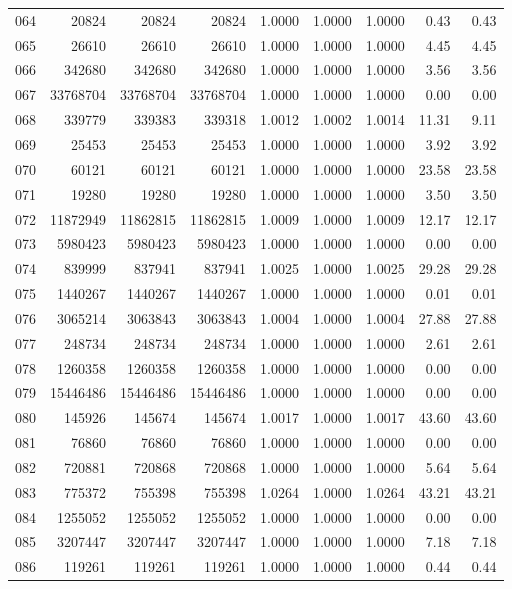 \begin{longtable}{crrrrrrrr}
064 & 20824 & 20824 & 20824 & 1.0000 & 1.0000 & 1.0000 & 0.43 & 0.43 \\
065 & 26610 & 26610 & 26610 & 1.0000 & 1.0000 & 1.0000 & 4.45 & 4.45 \\
066 & 342680 & 342680 & 342680 & 1.0000 & 1.0000 & 1.0000 & 3.56 & 3.56 \\
067 & 33768704 & 33768704 & 33768704 & 1.0000 & 1.0000 & 1.0000 & 0.00 & 0.00 \\
068 & 339779 & 339383 & 339318 & 1.0012 & 1.0002 & 1.0014 & 11.31 & 9.11 \\
069 & 25453 & 25453 & 25453 & 1.0000 & 1.0000 & 1.0000 & 3.92 & 3.92 \\
070 & 60121 & 60121 & 60121 & 1.0000 & 1.0000 & 1.0000 & 23.58 & 23.58 \\
071 & 19280 & 19280 & 19280 & 1.0000 & 1.0000 & 1.0000 & 3.50 & 3.50 \\
072 & 11872949 & 11862815 & 11862815 & 1.0009 & 1.0000 & 1.0009 & 12.17 & 12.17 \\
073 & 5980423 & 5980423 & 5980423 & 1.0000 & 1.0000 & 1.0000 & 0.00 & 0.00 \\
074 & 839999 & 837941 & 837941 & 1.0025 & 1.0000 & 1.0025 & 29.28 & 29.28 \\
075 & 1440267 & 1440267 & 1440267 & 1.0000 & 1.0000 & 1.0000 & 0.01 & 0.01 \\
076 & 3065214 & 3063843 & 3063843 & 1.0004 & 1.0000 & 1.0004 & 27.88 & 27.88 \\
077 & 248734 & 248734 & 248734 & 1.0000 & 1.0000 & 1.0000 & 2.61 & 2.61 \\
078 & 1260358 & 1260358 & 1260358 & 1.0000 & 1.0000 & 1.0000 & 0.00 & 0.00 \\
079 & 15446486 & 15446486 & 15446486 & 1.0000 & 1.0000 & 1.0000 & 0.00 & 0.00 \\
080 & 145926 & 145674 & 145674 & 1.0017 & 1.0000 & 1.0017 & 43.60 & 43.60 \\
081 & 76860 & 76860 & 76860 & 1.0000 & 1.0000 & 1.0000 & 0.00 & 0.00 \\
082 & 720881 & 720868 & 720868 & 1.0000 & 1.0000 & 1.0000 & 5.64 & 5.64 \\
083 & 775372 & 755398 & 755398 & 1.0264 & 1.0000 & 1.0264 & 43.21 & 43.21 \\
084 & 1255052 & 1255052 & 1255052 & 1.0000 & 1.0000 & 1.0000 & 0.00 & 0.00 \\
085 & 3207447 & 3207447 & 3207447 & 1.0000 & 1.0000 & 1.0000 & 7.18 & 7.18 \\
086 & 119261 & 119261 & 119261 & 1.0000 & 1.0000 & 1.0000 & 0.44 & 0.44 \\

\end{longtable}

